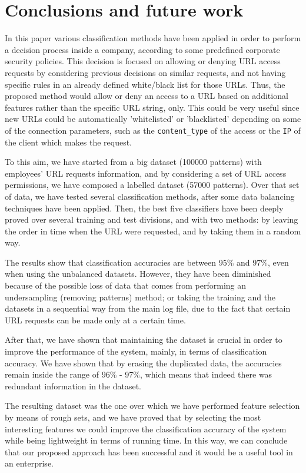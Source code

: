 \documentclass{llncs}
\begin{document}
\section{Conclusions and future work}
\label{sec:conclusions}
In this paper various classification methods have been applied in order to perform a decision process inside a company,
according to some predefined corporate security policies. This decision is focused on allowing or denying URL access
requests by considering previous decisions on similar requests, and not having specific rules in an already defined
white/black list for those URLs. Thus, the proposed method would allow or deny an access to a URL based on additional
features rather than the specific URL string, only. This could be very useful since new URLs could be
automatically 'whitelisted' or 'blacklisted' depending on some of the connection parameters,
such as the \texttt{content\_type} of the access or the \texttt{IP} of the client which makes the request.

To this aim, we have started from a big dataset (100000 patterns) with employees' URL requests information,
and by considering a set of URL access permissions, we have composed a labelled dataset (57000 patterns).
Over that set of data, we have tested several classification methods, after some data balancing techniques
have been applied. Then, the best five classifiers have been deeply proved over several training and test divisions,
and with two methods: by leaving the order in time when the URL were requested, and by taking them in a random way.

The results show that classification accuracies are between 95\% and 97\%, even when using the unbalanced datasets.
However, they have been diminished because of the possible loss of data that comes from performing an undersampling
(removing patterns) method; or taking the training and the datasets in a sequential way from the main log file,
due to the fact that certain URL requests can be made only at a certain time.

After that, we have shown that maintaining the dataset is crucial in order to improve the performance of
the system, mainly, in terms of classification accuracy. We have shown that by erasing the duplicated data,
the accuracies remain inside the range of 96\% - 97\%, which means that indeed there was redundant information
in the dataset.

The resulting dataset was the one over which we have performed feature selection by means of rough sets,
and we have proved that by selecting the most interesting features we could improve the classification accuracy of
the system while being lightweight in terms of running time. In this way, we can conclude that our proposed approach
has been successful and it would be a useful tool in an enterprise.
\end{document}

